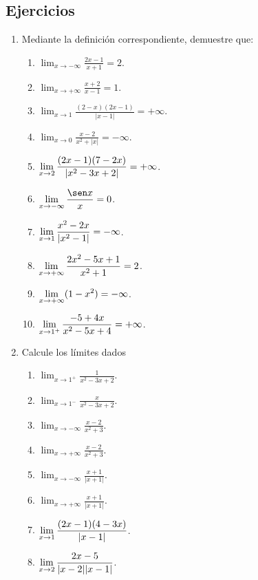 \subsection{Ejercicios}
\begingroup
\small
\begin{multicols}{2}
\begin{enumerate}[leftmargin=*]
\item Mediante la definición correspondiente, demuestre que:
            \begin{enumerate}[leftmargin=*]
            \item $\displaystyle \lim_{x\to -\infty}\frac{2x-1}{x+1}=2$.
            \item $\displaystyle \lim_{x\to +\infty}\frac{x+2}{x-1}=1$.
            \item $\displaystyle \lim_{x\to 1}\frac{(2-x)(2x-1)}{|x-1|}=+\infty$.
            \item $\displaystyle \lim_{x\to 0}\frac{x-2}{x^2+|x|}=-\infty$.
            \item $\displaystyle \limjc{\frac{(2x - 1)(7 - 2x)}{|x^2 - 3x + 2|}}{x}{2} =
                +\infty$.
            \item $\displaystyle \limjc{\frac{\sen x}{x}}{x}{-\infty} = 0$.
            \item $\displaystyle \limjc{\frac{x^2 - 2x}{|x^2 - 1|}}{x}{1} = -\infty$.
            \item $\displaystyle \limjc{\frac{2x^2 - 5x + 1}{x^2 + 1}}{x}{+\infty} = 2$.
            \item $\displaystyle \limjc{(1 - x^2)}{x}{+\infty} = -\infty$.
            \item $\displaystyle \limjc{\frac{-5 + 4x}{x^2 - 5x + 4}}{x}{1^+} =
                +\infty$.
             \end{enumerate}

\item Calcule los límites dados
            \begin{enumerate}
            \item $\displaystyle \lim_{x\to 1^+}\frac{1}{x^2-3x+2}$.
            \item $\displaystyle \lim_{x\to 1^-}\frac{x}{x^2-3x+2}$.
            \item $\displaystyle \lim_{x\to -\infty}\frac{x-2}{x^2+3}$.
            \item $\displaystyle \lim_{x\to +\infty}\frac{x-2}{x^2+3}$.
            \item $\displaystyle \lim_{x\to -\infty}\frac{x+1}{|x+1|}$.
            \item $\displaystyle \lim_{x\to +\infty}\frac{x+1}{|x+1|}$.
            \item $\displaystyle \limjc{\frac{(2x - 1)(4 - 3x)}{|x - 1|}}{x}{1}$.
            \item $\displaystyle \limjc{\frac{2x - 5}{|x - 2||x - 1|}}{x}{2}$.
            \end{enumerate}


\end{enumerate}
\end{multicols}
